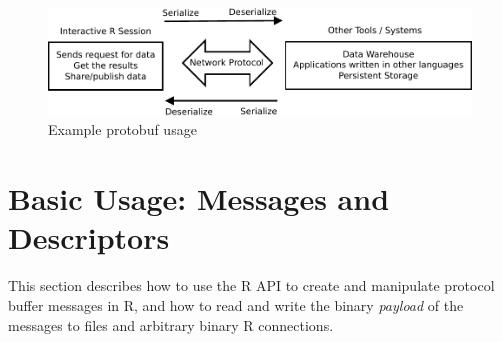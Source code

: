 \documentclass[article]{jss}
\begin{document}




\begin{figure}[t]
\begin{center}
\includegraphics[width=\textwidth]{protobuf-distributed-system-crop.pdf}
\end{center}
\caption{Example protobuf usage}
\label{fig:protobuf-distributed-usecase}
\end{figure}

\section{Basic Usage: Messages and Descriptors}

This section describes how to use the R API to create and manipulate
protocol buffer messages in R, and how to read and write the
binary \emph{payload} of the messages to files and arbitrary binary
R connections.
\end{document}
